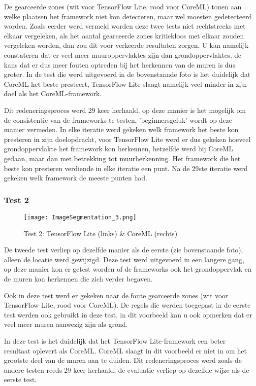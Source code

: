 De gearceerde zones (wit voor TensorFlow Lite, rood voor CoreML) tonen aan welke plaatsen het framework niet kon detecteren, maar wel moesten gedetecteerd worden. Zoals eerder werd vermeld worden deze twee tests niet rechtstreeks met elkaar vergeleken, als het aantal gearceerde zones kritiekloos met elkaar zouden vergeleken worden, dan zou dit voor verkeerde resultaten zorgen. U kan namelijk constateren dat er veel meer muuroppervlaktes zijn dan grondoppervlaktes, de kans dat er dus meer fouten optreden bij het herkennen van de muren is dus groter. In de test die werd uitgevoerd in de bovenstaande foto is het duidelijk dat CoreML het beste presteert, TensorFlow Lite slaagt namelijk veel minder in zijn doel als het CoreML-framework. 

Dit redeneringsproces werd 29 keer herhaald, op deze manier is het mogelijk om de consistentie van de frameworks te testen,  'beginnersgeluk' wordt op deze manier vermeden. In elke iteratie werd gekeken welk framework het beste kon presteren in zijn doelopdracht, voor TensorFlow Lite werd er dus gekeken hoeveel grondoppervlakte het framework kon herkennen, hetzelfde werd bij CoreML gedaan, maar dan met betrekking tot muurherkenning. Het framework die het beste kon presteren verdiende in elke iteratie een punt. Na de 29ste iteratie werd gekeken welk framework de meeste punten had.

\subsubsection{Test 2}
\begin{figure}[H]
	\centering
	\texttt{[image: ImageSegmentation\_3.png]}
	\caption{Test 2: TensorFlow Lite (links) \& CoreML (rechts)}
\end{figure}
De tweede test verliep op dezelfde manier als de eerste (zie bovenstaande foto), alleen de locatie werd gewijzigd. Deze test werd uitgevoerd in een langere gang, op deze manier kon er getest worden of de frameworks ook het grondoppervlak en de muren kon herkennen die zich verder begaven. 

Ook in deze test werd er gekeken naar de foute gearceerde zones (wit voor TensorFlow Lite, rood voor CoreML). De regels die werden toegepast in de eerste test werden ook gebruikt in deze test, in dit voorbeeld kan u ook opmerken dat er veel meer muren aanwezig zijn als grond.

In deze test is het duidelijk dat het TensorFlow Lite-framework een beter resultaat oplevert als CoreML. CoreML slaagt in dit voorbeeld er niet in om het grootste deel van de muren aan te duiden. Dit redeneringsproces werd zoals de andere testen reeds 29 keer herhaald, de evaluatie verliep op dezelfde wijze als de eerste test.

